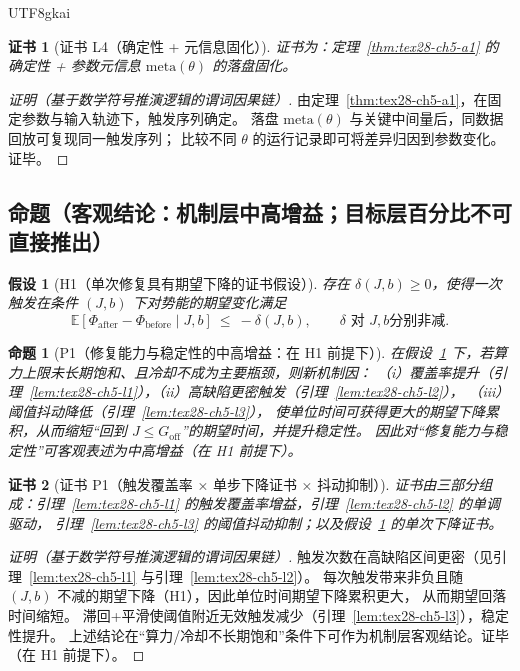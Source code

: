 \documentclass[12pt]{article}
\newtheorem{assumption}{假设}[section]
\newtheorem{proposition}{命题}[section]
\newtheorem{Certificate}{证书}[section]
\begin{document}
\begin{CJK*}{UTF8}{gkai}
\begin{Certificate}[证书 L4（确定性 + 元信息固化）]
\label{cert:tex28-ch5-l4}
证书为：定理~\ref{thm:tex28-ch5-a1} 的确定性 + 参数元信息 $\mathrm{meta}(\theta)$ 的落盘固化。
\end{Certificate}

\begin{proof}[证明（基于数学符号推演逻辑的谓词因果链）]
由定理~\ref{thm:tex28-ch5-a1}，在固定参数与输入轨迹下，触发序列确定。
落盘 $\mathrm{meta}(\theta)$ 与关键中间量后，同数据回放可复现同一触发序列；
比较不同 $\theta$ 的运行记录即可将差异归因到参数变化。证毕。
\end{proof}

\subsection{命题（客观结论：机制层中高增益；目标层百分比不可直接推出）}
\label{subsec:tex28-ch5-props}

\begin{assumption}[H1（单次修复具有期望下降的证书假设）]
\label{assu:tex28-ch5-h1}
存在 $\delta(J,b)\ge 0$，使得一次触发在条件 $(J,b)$ 下对势能的期望变化满足
\[
  \mathbb{E}[\Phi_{\mathrm{after}}-\Phi_{\mathrm{before}}\mid J,b]\ \le\ -\delta(J,b),
  \qquad
  \delta \text{ 对 }J,b\text{分别非减}.
\]
\end{assumption}

\begin{proposition}[P1（修复能力与稳定性的中高增益：在 H1 前提下）]
\label{prop:tex28-ch5-p1}
在假设~\ref{assu:tex28-ch5-h1} 下，若算力上限未长期饱和、且冷却不成为主要瓶颈，则新机制因：
（i）覆盖率提升（引理~\ref{lem:tex28-ch5-l1}），（ii）高缺陷更密触发（引理~\ref{lem:tex28-ch5-l2}），
（iii）阈值抖动降低（引理~\ref{lem:tex28-ch5-l3}），
使单位时间可获得更大的期望下降累积，从而缩短“回到 $J\le G_{\mathrm{off}}$”的期望时间，并提升稳定性。
因此对“修复能力与稳定性”可客观表述为中高增益（在 H1 前提下）。
\end{proposition}

\begin{Certificate}[证书 P1（触发覆盖率 × 单步下降证书 × 抖动抑制）]
\label{cert:tex28-ch5-p1}
证书由三部分组成：引理~\ref{lem:tex28-ch5-l1} 的触发覆盖率增益，引理~\ref{lem:tex28-ch5-l2} 的单调驱动，
引理~\ref{lem:tex28-ch5-l3} 的阈值抖动抑制；以及假设~\ref{assu:tex28-ch5-h1} 的单次下降证书。
\end{Certificate}

\begin{proof}[证明（基于数学符号推演逻辑的谓词因果链）]
触发次数在高缺陷区间更密（见引理~\ref{lem:tex28-ch5-l1} 与引理~\ref{lem:tex28-ch5-l2}）。
每次触发带来非负且随 $(J,b)$ 不减的期望下降（H1），因此单位时间期望下降累积更大，
从而期望回落时间缩短。
滞回+平滑使阈值附近无效触发减少（引理~\ref{lem:tex28-ch5-l3}），稳定性提升。
上述结论在“算力/冷却不长期饱和”条件下可作为机制层客观结论。证毕（在 H1 前提下）。
\end{proof}


\end{CJK*}
\end{document}

